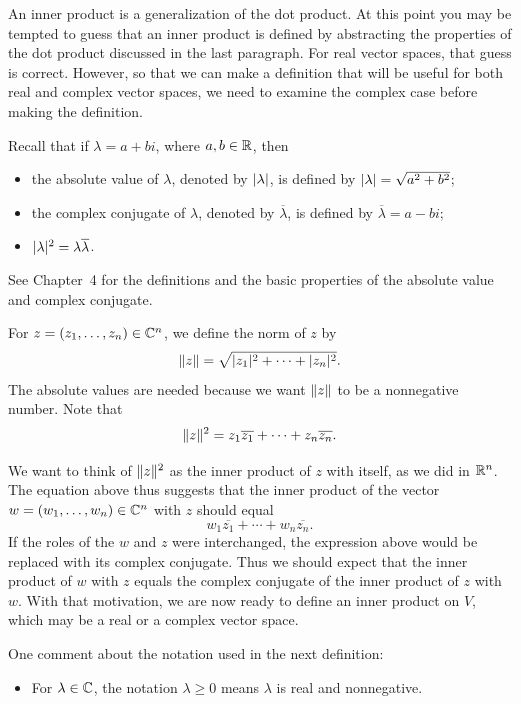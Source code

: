 An inner product is a generalization of the dot product. At this point you may
be tempted to guess that an inner product is defined by abstracting the
properties of the dot product discussed in the last paragraph. For real vector
spaces, that guess is correct. However, so that we can make a definition that
will be useful for both real and complex vector spaces, we need to examine the
complex case before making the definition.

Recall that if $\lambda=a+bi$, where $a,b\in\mathbb{R}$, then
\begin{itemize}
\item the absolute value of $\lambda$, denoted by $\lvert \lambda \rvert$, is defined by
  $\lvert \lambda \rvert=\sqrt{a^2+b^2}$;
\item the complex conjugate of $\lambda$, denoted by $\overline{\lambda}$, is
  defined by $\overline{\lambda}=a-bi$;
\item $\lvert \lambda \rvert^2=\lambda\overline{\lambda}$.
\end{itemize}
See Chapter~4 for the definitions and the basic properties of the absolute value
and complex conjugate.

For $z=(z_1,\dots,z_n)\in\mathbb{C}^n$, we define the norm of $z$ by
\[ \lVert z \rVert = \sqrt{\lvert z_1 \rvert^2+\cdots+\lvert z_n \rvert^2}. \]
The absolute values are needed because we want $\lVert z \rVert$ to be a nonnegative
number. Note that
\[ \lVert z \rVert^2 = z_1\overline{z_1}+\cdots+z_n\overline{z_n}. \]

We want to think of $\lVert z \rVert^2$ as the inner product of $z$ with itself, as we
did in $\mathbb{R}^n$. The equation above thus suggests that the inner product of the
vector $w=(w_1,\dots,w_n)\in\mathbb{C}^n$ with $z$ should equal
\[ w_1\overline{z_1}+\cdots+w_n\overline{z_n}. \]
If the roles of the $w$ and $z$ were interchanged, the expression above would be
replaced with its complex conjugate. Thus we should expect that the inner
product of $w$ with $z$ equals the complex conjugate of the inner product of $z$
with $w$. With that motivation, we are now ready to define an inner product on
$V$, which may be a real or a complex vector space.

One comment about the notation used in the next definition:
\begin{itemize}
\item For $\lambda\in\mathbb{C}$, the notation $\lambda\ge0$ means $\lambda$ is real and
  nonnegative.
\end{itemize}

